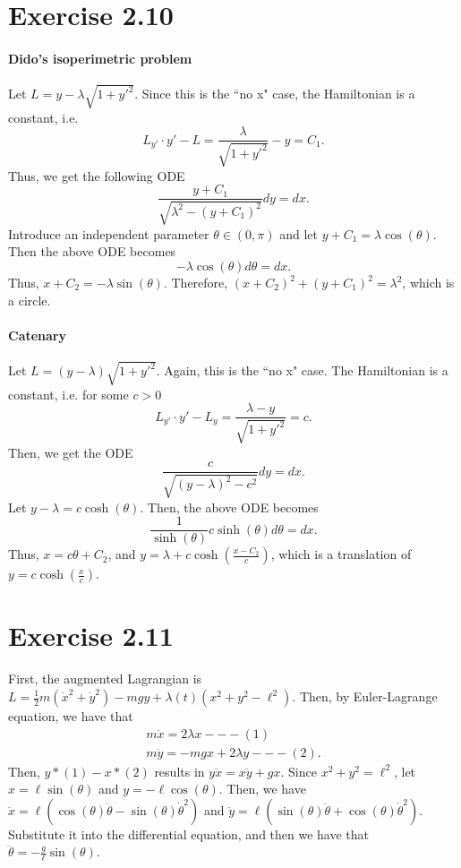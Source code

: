 \documentclass[11pt]{report}
\begin{document}
\section*{Exercise 2.10}
\paragraph{Dido’s isoperimetric problem} Let $L = y - \lambda \sqrt{1+y'^2}$. Since this is the ``no x" case, the Hamiltonian is a constant, i.e.
\[
L_{y'} \cdot y' - L = \frac{\lambda}{\sqrt{1+y'^2}} - y = C_1.
\]
Thus, we get the following ODE
\[
\frac{y+C_1}{\sqrt{\lambda^2 - (y+C_1)^2}} dy = dx.
\]
Introduce an independent parameter $\theta \in (0, \pi)$ and let $y + C_1 = \lambda \cos(\theta)$. Then the above ODE becomes
\[
-\lambda \cos(\theta) d\theta = dx.
\]
Thus, $x+C_2 = -\lambda \sin(\theta)$. Therefore, $(x+C_2)^2 + (y+C_1)^2 = \lambda^2$, which is a circle.

\paragraph{Catenary}
Let $L = (y - \lambda) \sqrt{1+y'^2}$. Again, this is the ``no x" case. The Hamiltonian is a constant, i.e. for some $c > 0$
\[
L_{y'} \cdot y' - L_y = \frac{\lambda - y}{\sqrt{1+y'^2}} = c.
\]
Then, we get the ODE
\[
\frac{c}{\sqrt{(y-\lambda)^2 - c^2}} dy = dx.
\]
Let $y - \lambda = c\cosh(\theta)$. Then, the above ODE becomes
\[
\frac{1}{\sinh(\theta)} c\sinh(\theta) d\theta = dx.
\]
Thus, $x = c\theta + C_2$, and $y = \lambda + c\cosh\left(\frac{x-C_2}{c}\right)$, which is a translation of $y = c\cosh\left(\frac{x}{c}\right)$.
\section*{Exercise 2.11}
First, the augmented Lagrangian is $L = \frac{1}{2}m(\dot{x}^2 + \dot{y}^2) - mgy + \lambda(t)(x^2 + y^2 - \ell^2)$. Then, by Euler-Lagrange equation, we have that
\begin{align*}
m \ddot{x} = 2\lambda x --- (1)\\
m \ddot{y} = -mgx + 2\lambda y --- (2).
\end{align*}
Then, $y * (1) - x * (2)$ results in $y\ddot{x} = x\ddot{y}+gx$.
Since $x^2 + y^2 = \ell^2$, let $x = \ell \sin(\theta)$ and $y = - \ell \cos(\theta)$. Then, we have $\ddot{x} = \ell (\cos(\theta) \ddot{\theta} - \sin(\theta) \dot{\theta}^2)$ and $\ddot{y} = \ell (\sin(\theta) \ddot{\theta} + \cos(\theta) \dot{\theta}^2)$. Substitute it into the differential equation, and then we have that $\ddot{\theta} = -\frac{g}{\ell}\sin(\theta)$.
\end{document}
